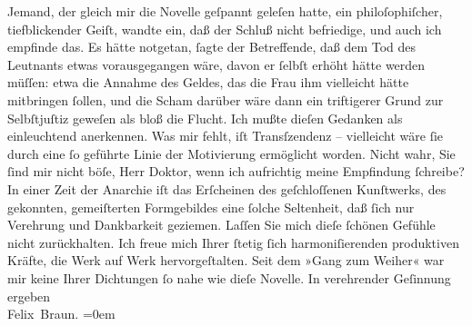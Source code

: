 \begin{ledgroupsized}[t]{13cm}
           \pstart
           Jemand, der gleich mir die
                        Novelle geſpannt geleſen
                    hatte, ein philoſophiſcher, tiefblickender Geiſt, wandte ein, daß der Schluß
                    nicht befriedige, und auch ich empfinde das. Es hätte notgetan, ſagte der Betreffende, daß dem Tod
                    des Leutnants etwas vorausgegangen wäre, davon er ſelbſt erhöht hätte werden
                    müſſen: etwa die Annahme des Geldes, das die Frau ihm vielleicht hätte
                    mitbringen ſollen, und die Scham darüber wäre dann ein triftigerer Grund zur
                    Selbſtjuſtiz geweſen als bloß die Flucht. Ich {\pb}mußte dieſen
                    Gedanken als einleuchtend anerkennen. Was mir fehlt, iſt Transſzendenz –
                    vielleicht wäre ſie durch eine ſo geführte Linie der Motivierung ermöglicht
                    worden. Nicht wahr, Sie ſind mir nicht böſe, Herr Doktor, wenn ich aufrichtig
                    meine Empfindung ſchreibe?\pend
           \pstart
           In einer Zeit der Anarchie iſt das Erſcheinen des geſchloſſenen Kunſtwerks, des
                    gekonnten, gemeiſterten Formgebildes eine ſolche Seltenheit, daß ſich nur
                    Verehrung und Dankbarkeit geziemen. Laſſen Sie mich dieſe ſchönen Gefühle nicht
                    zurückhalten. Ich freue mich Ihrer ſtetig ſich harmoni{\pb}ſierenden
                    produktiven Kräfte, die Werk auf Werk hervorgeſtalten. Seit dem »Gang zum Weiher« war mir keine Ihrer
                    Dichtungen ſo nahe wie dieſe Novelle.\pend
           \pstart
           In verehrender Geſinnung ergeben{\\[\baselineskip]}\spacefill\mbox{Felix Braun.}\pend
           \leftskip=0em{}          \endnumbering{}\end{ledgroupsized}  \newcommand{\dateiname}{L02486}\newcommand{\titel}{Felix Braun an Arthur Schnitzler, 10. 5. 1927}\newcommand{\editorInnen}{Martin Anton Müller und Gerd-Hermann Susen}
      